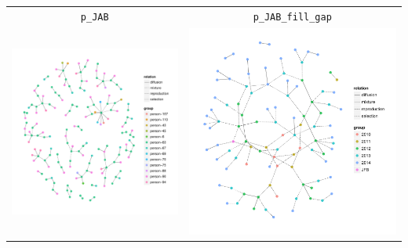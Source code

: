 \documentclass{article}\usepackage[]{graphicx}\usepackage[]{color}
\newenvironment{knitrout}{}{} %
\begin{document}
\begin{center}
\begin{tabular}{cc}
\texttt{p\_JAB} & \texttt{p\_JAB\_fill\_gap} \\
\begin{knitrout}
\definecolor{shadecolor}{rgb}{0.969, 0.969, 0.969}\color{fgcolor}

{\centering \includegraphics[width=.5\textwidth]{figures/shinemas2R_unnamed-chunk-25-1} 

}



\end{knitrout}
&
\begin{knitrout}
\definecolor{shadecolor}{rgb}{0.969, 0.969, 0.969}\color{fgcolor}

{\centering \includegraphics[width=.5\textwidth]{figures/shinemas2R_unnamed-chunk-26-1} 

}



\end{knitrout}
\\
\end{tabular}
\end{center}
\end{document}
